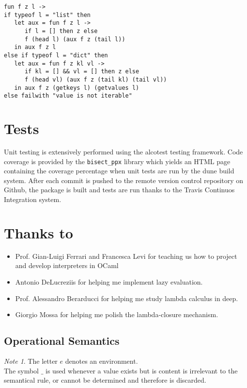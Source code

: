 \documentclass[a4paper, 10pt]{article}
\theoremstyle{plain}%
\theoremstyle{definition}
\theoremstyle{remark}
\newtheorem*{note}{Note}
\begin{document}
\begin{multicols}{2}
\begin{lstlisting}[style=caml,caption=The right fold procedure]
fun f z l ->
if typeof l = "list" then
   let aux = fun f z l ->
	  if l = [] then z else
	  f (head l) (aux f z (tail l))
   in aux f z l
else if typeof l = "dict" then
   let aux = fun f z kl vl ->
	  if kl = [] && vl = [] then z else
	  f (head vl) (aux f z (tail kl) (tail vl))
   in aux f z (getkeys l) (getvalues l)
else failwith "value is not iterable"
\end{lstlisting}


\section{Tests}
Unit testing is extensively performed using the alcotest testing framework. Code
coverage is provided by the \texttt{bisect\_ppx} library which yields an HTML
page containing the coverage percentage when unit tests are run by the dune
build system. After each commit is pushed to the remote version control repository on
Github, the package is built and tests are run thanks to the Travis Continuos
Integration system.

\section{Thanks to}

\begin{itemize}
	\item Prof. Gian-Luigi Ferrari and Francesca Levi for teaching us how to project and develop
	interpreters in OCaml
	\item Antonio DeLucreziis for helping me implement lazy evaluation.
	\item Prof. Alessandro Berarducci for helping me study lambda calculus in deep.
	\item Giorgio Mossa for helping me polish the lambda-closure mechanism.
\end{itemize}

\end{multicols}

\iffalse
\subsection{Operational Semantics}

\begin{note}
	The letter $e$ denotes an environment. \\
	The symbol $\_$ is used whenever a value exists but is content is irrelevant
	to the semantical rule, or cannot be determined and therefore is discarded.
\end{note}
\end{document}
